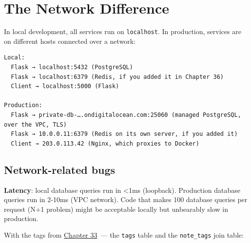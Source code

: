 \setcounter{section}{3}
\section{The Network Difference}\label{39-local-vs-production:394-the-network-difference}

In local development, all services run on \texttt{localhost}. In production, services are on different hosts connected over a network:

\begin{outputbox}[short]
\begin{Verbatim}[fontsize=\codesize, breaklines, breakanywhere, breaksymbolleft={\tiny\textcolor{muted}{$\hookrightarrow$}}]
Local:
  Flask → localhost:5432 (PostgreSQL)
  Flask → localhost:6379 (Redis, if you added it in Chapter 36)
  Client → localhost:5000 (Flask)

Production:
  Flask → private-db-….ondigitalocean.com:25060 (managed PostgreSQL, over the VPC, TLS)
  Flask → 10.0.0.11:6379 (Redis on its own server, if you added it)
  Client → 203.0.113.42 (Nginx, which proxies to Docker)
\end{Verbatim}
\end{outputbox}

\subsection*{Network-related bugs}\label{39-local-vs-production:network-related-bugs}

\textbf{Latency}: local database queries run in \textless1ms (loopback). Production database queries run in 2-10ms (VPC network). Code that makes 100 database queries per request (N+1 problem) might be acceptable locally but unbearably slow in production.

With the tags from \hyperref[ch:33-logic-execution]{Chapter 33}~--- the \texttt{tags} table and the \texttt{note\_tags} join table:

